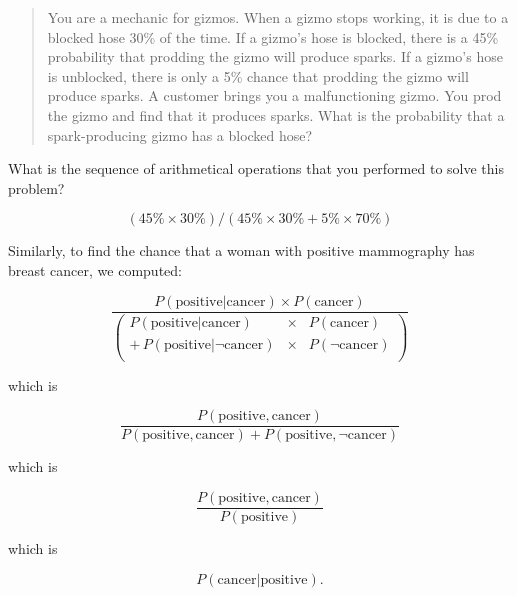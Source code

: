 {{\hr

\begin{quote}
{
 You are a mechanic for gizmos. When a gizmo stops working, it is
due to a blocked hose 30\% of the time. If a gizmo's
hose is blocked, there is a 45\% probability that prodding the gizmo
will produce sparks. If a gizmo's hose is unblocked,
there is only a 5\% chance that prodding the gizmo will produce sparks.
A customer brings you a malfunctioning gizmo. You prod the gizmo and
find that it produces sparks. What is the probability that a
spark-producing gizmo has a blocked hose?}
\end{quote}

{
 What is the sequence of arithmetical operations that you performed
to solve this problem?}

\begin{equation*}
 (45\% \times 30\%) / (45\% \times 30\% + 5\% \times 70\%)
\end{equation*}

{
 Similarly, to find the chance that a woman with positive
mammography has breast cancer, we computed:}

\begin{equation*}
  \frac{P(\text{positive}|\text{cancer})\times P(\text{cancer})}
       {\left(\begin{array}{rcl}
           P(\text{positive}|\text{cancer}) & \times & P(\text{cancer}) \\
           +\, P(\text{positive}|\lnot \text{cancer}) & \times & P(\lnot \text{cancer}) \\
         \end{array}
         \right)}
\end{equation*}


{
 which is}

\begin{equation*}
  \frac{P(\text{positive},\text{cancer})}
  {P(\text{positive},\text{cancer}) + P(\text{positive},\lnot\text{cancer})}
\end{equation*}

{
 which is}

\begin{equation*}
  \frac{P(\text{positive},\text{cancer})}{ P(\text{positive})}
\end{equation*}


{
 which is}

\begin{equation*}
  P(\text{cancer}|\text{positive}).
\end{equation*}

}}
